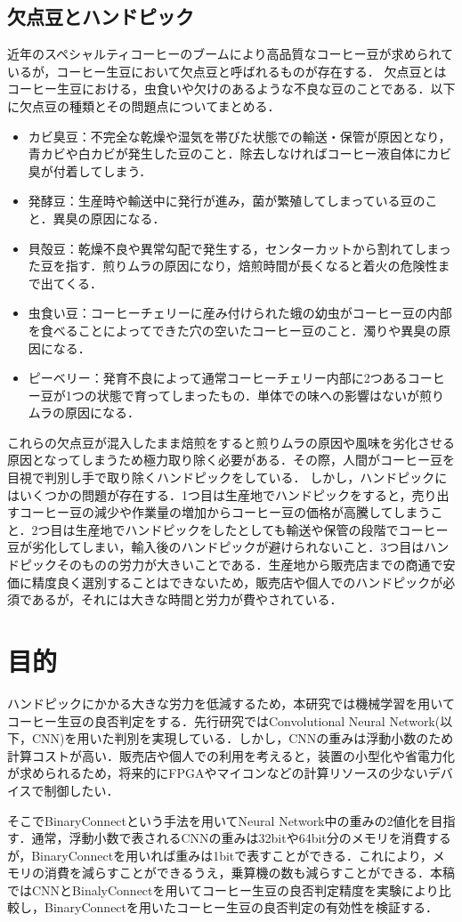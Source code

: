 \subsection{欠点豆とハンドピック}
近年のスペシャルティコーヒーのブームにより高品質なコーヒー豆が求められているが，コーヒー生豆において欠点豆と呼ばれるものが存在する．
欠点豆とはコーヒー生豆における，虫食いや欠けのあるような不良な豆のことである．以下に欠点豆の種類とその問題点についてまとめる\cite{coffeetaizenn}．
\begin{itemize}
  \item カビ臭豆：不完全な乾燥や湿気を帯びた状態での輸送・保管が原因となり，青カビや白カビが発生した豆のこと．除去しなければコーヒー液自体にカビ臭が付着してしまう．
  \item 発酵豆：生産時や輸送中に発行が進み，菌が繁殖してしまっている豆のこと．異臭の原因になる．
  \item 貝殻豆：乾燥不良や異常勾配で発生する，センターカットから割れてしまった豆を指す．煎りムラの原因になり，焙煎時間が長くなると着火の危険性まで出てくる．
  \item 虫食い豆：コーヒーチェリーに産み付けられた蛾の幼虫がコーヒー豆の内部を食べることによってできた穴の空いたコーヒー豆のこと．濁りや異臭の原因になる．
  \item ピーベリー：発育不良によって通常コーヒーチェリー内部に2つあるコーヒー豆が1つの状態で育ってしまったもの．単体での味への影響はないが煎りムラの原因になる．
\end{itemize}

これらの欠点豆が混入したまま焙煎をすると煎りムラの原因や風味を劣化させる原因となってしまうため極力取り除く必要がある．その際，人間がコーヒー豆を目視で判別し手で取り除くハンドピックをしている．
しかし，ハンドピックにはいくつかの問題が存在する．1つ目は生産地でハンドピックをすると，売り出すコーヒー豆の減少や作業量の増加からコーヒー豆の価格が高騰してしまうこと．2つ目は生産地でハンドピックをしたとしても輸送や保管の段階でコーヒー豆が劣化してしまい，輸入後のハンドピックが避けられないこと．3つ目はハンドピックそのものの労力が大きいことである．生産地から販売店までの商通で安価に精度良く選別することはできないため，販売店や個人でのハンドピックが必須であるが，それには大きな時間と労力が費やされている．

\section{目的}
ハンドピックにかかる大きな労力を低減するため，本研究では機械学習を用いてコーヒー生豆の良否判定をする．先行研究ではConvolutional Neural Network(以下，CNN)を用いた判別を実現している．しかし，CNNの重みは浮動小数のため計算コストが高い．販売店や個人での利用を考えると，装置の小型化や省電力化が求められるため，将来的にFPGAやマイコンなどの計算リソースの少ないデバイスで制御したい．

そこでBinaryConnectという手法を用いてNeural Network中の重みの2値化を目指す．通常，浮動小数で表されるCNNの重みは32bitや64bit分のメモリを消費するが，BinaryConnectを用いれば重みは1bitで表すことができる．これにより，メモリの消費を減らすことができるうえ，乗算機の数も減らすことができる．本稿ではCNNとBinalyConnectを用いてコーヒー生豆の良否判定精度を実験により比較し，BinaryConnectを用いたコーヒー生豆の良否判定の有効性を検証する．
